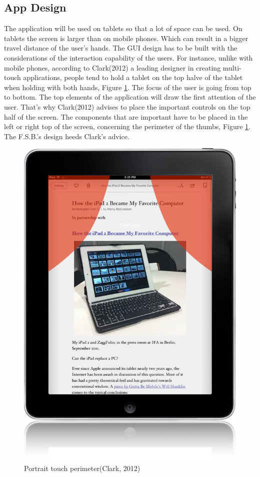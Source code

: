 \subsection{App Design} 
\label{sec:appdesign}
The application will be used on tablets so that a lot of space can be used. On tablets the screen is larger than on mobile phones. Which can result in a bigger travel distance of the user's hands. The GUI design has to be built with the considerations of the interaction capability of the users. For instance, unlike with mobile phones, according to Clark(2012) a leading designer in creating multi-touch applications, people tend to hold a tablet on the top halve of the tablet when holding with both hands, Figure \ref{fig:perimeter}. The focus of the user is going from top to bottom. The top elements of the application will draw the first attention of the user. That's why Clark(2012) advises to place the important controls on the top half of the screen. The components that are important have to be placed in the left or right top of the screen, concerning the perimeter of the thumbs, Figure \ref{fig:perimeter}. The F.S.B.'s design heeds Clark's advice.
\begin{figure}[H]
\center
\includegraphics[scale=0.3]{touch.png}
\caption{Portrait touch perimeter(Clark, 2012)}
\label{fig:perimeter}
\end{figure}
